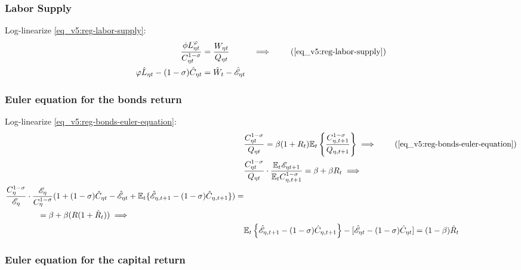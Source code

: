 \documentclass[../thesis.tex]{subfiles}
\begin{document}

\subsubsection*{Labor Supply}

Log-linearize \ref{eq_v5:reg-labor-supply}:
\begin{alignat}{2}
	\frac{\phi L_{\eta t}^{\varphi}}{C_{\eta t}^{1-\sigma}} &= \frac{W_{\eta t}}{Q_{\eta t}} &\implies \tag{\ref{eq_v5:reg-labor-supply}} \\
	\varphi \hat{L}_{\eta t} - (1 -\sigma) \hat{C}_{\eta t} &= \hat{W}_t - \hat{ \mathscr{E} }_{\eta t} & \label{eq_v5:reg-ll-labor-supply}
\end{alignat}


\subsubsection*{Euler equation for the bonds return}

Log-linearize \ref{eq_v5:reg-bonds-euler-equation}:
\begin{alignat}{2}
	& \frac{ C_{\eta t}^{1-\sigma}}{Q_{\eta t}} = \beta (1 + R_{t}) \E \left\{ \frac{ C_{\eta, t+1}^{1-\sigma}}{Q_{\eta, t+1}} \right\} \implies \tag{\ref{eq_v5:reg-bonds-euler-equation}}\\
	& \frac{ C_{\eta t}^{1-\sigma}}{Q_{\eta t}} \cdot \frac{\E \te[t+1]}{\E C_{\eta, t+1}^{1-\sigma}} = \beta + \beta R_{t} \implies \nonumber \\
	\begin{split}
		& \frac{C_{\eta}^{1-\sigma}}{\te[]} \cdot \frac{\te[]}{C_{\eta}^{1-\sigma}} (1 + (1-\sigma) \hat{C}_{\eta t} - \hat{\mathscr{E}}_{\eta t} + \E \{ \hat{\mathscr{E}}_{\eta, t+1} - (1 -\sigma) \hat{C}_{\eta, t+1} \}) = \\ & \qquad \qquad = \beta + \beta (R(1 + \hat{R}_{t})) \implies
	\end{split} \nonumber \\
	& \E \left\{ \hat{\mathscr{E}}_{\eta, t+1} - (1 -\sigma) \hat{C}_{\eta, t+1} \right\} - [\hat{\mathscr{E}}_{\eta t} - (1 -\sigma) \hat{C}_{\eta t}] = (1 -\beta) \hat{R}_{t} \label{eq_v5:reg-ll-bonds-euler-equation}
\end{alignat}


\subsubsection*{Euler equation for the capital return}
\end{document}

